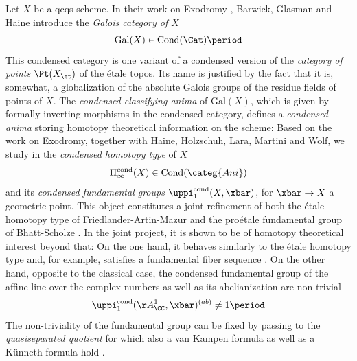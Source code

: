 \documentclass[leqno]{article}
\renewcommand{\Gal}{\mathrm{Gal}}
\newcommand{\Ani}{\categ{Ani}}
\DeclareMathOperator{\Cond}{Cond}
\newcommand{\CondAni}{\Cond(\Ani)}
\newcommand{\cond}{\mathrm{cond}}
\newcommand{\Picond}{\Pi_{\infty}^{\cond}}
\newcommand{\CondShape}[1]{\Picond(#1)}
\newcommand{\picond}{\uppi^{\cond}}
\newcommand{\pionecond}{\picond_1}
\begin{document}
Let $X$ be a qcqs scheme. In their work on Exodromy \cite{Exodromy}, Barwick, Glasman and Haine introduce the \textit{Galois category of $X$} $$\Gal(X)\in \Cond(\Cat)\period$$
This condensed category is one variant of a condensed version of the \textit{category of points} $\Pt(X_{\et})$ of the \'etale topos. 
Its name is justified by the fact that it is, somewhat, a globalization of the absolute Galois groups of the residue fields of points of $X$.
The \textit{condensed classifying anima} of $\Gal(X)$, which is given by formally inverting morphisms in the condensed category, defines a \textit{condensed anima} storing homotopy theoretical information on the scheme:
Based on the work on Exodromy, together with Haine, Holzschuh, Lara, Martini and Wolf, we study in \cite{The_condensed_homotopy_type} the \textit{condensed homotopy type} of $X$$$\CondShape{X} \in \CondAni$$ and its \textit{condensed fundamental groups} $\pionecond(X, \xbar)$, for $\xbar \rightarrow X$ a geometric point.
This object constitutes a joint refinement of both the \'etale homotopy type of Friedlander-Artin-Mazur \cites[§4]{MR676809}[§9]{MR245577} and the pro\'etale fundamental group of Bhatt-Scholze \cite[§7]{MR3379634}.
In the joint project, it is shown to be of homotopy theoretical interest beyond that:
On the one hand, it behaves similarly to the \'etale homotopy type and, for example, satisfies a fundamental fiber sequence \cite[Corollary 5.6]{The_condensed_homotopy_type}.
On the other hand, opposite to the classical case, the condensed fundamental group of the affine line over the complex numbers as well as its abelianization are non-trivial \cite[Corollary 7.8]{The_condensed_homotopy_type}
\begin{equation*}
    \picond_1(\AA_{\CC}^1,\xbar)^{(ab)}\neq 1 \period
\end{equation*}  
%
The non-triviality of the fundamental group can be fixed by passing to the \textit{quasiseparated quotient} for which also a van Kampen formula as well as a Künneth formula hold \cite[Theorem 1.12 and Theorem 1.13]{The_condensed_homotopy_type}.
\end{document}
